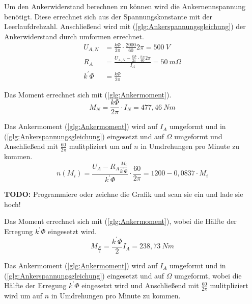 \begin{solution}
\begin{compactenum}
\item Um den Ankerwiderstand berechnen zu können wird die Ankernennspannung benötigt. Diese errechnet sich aus der Spannungskonstante mit der Leerlaufdrehzahl. Anschließend wird mit (\ref{glg:Ankerspannungsgleichung}) der Ankerwiderstand durch umformen errechnet.\\
\begin{align}
U_{A,N} &= \frac{k \Phi}{2 \pi} \cdot \frac{2000}{60} 2 \pi = 500~V\\
R_A &= \frac{U_{A,N} - \frac{k \Phi}{2 \pi} \cdot \frac{n_N}{60} 2 \pi}{I_A}=50~m \Omega\\
k^{'}\Phi&= \frac{k \Phi}{2 \pi}
\end{align}
\item Das Moment errechnet sich mit (\ref{glg:Ankermoment}).\\
\begin{equation}
M_N=\frac{k \Phi}{2 \pi} \cdot I_N =477,46~Nm
\end{equation}
\item Das Ankermoment (\ref{glg:Ankermoment}) wird auf $I_A$ umgeformt und in (\ref{glg:Ankerspannungsgleichung}) eingesetzt und auf $\Omega$ umgeformt und Anschließend mit $\frac{60}{2 \pi}$ mulitpliziert um auf $n$ in Umdrehungen pro Minute zu kommen.
\begin{equation}
n(M_i) = \frac{U_A - R_A \frac{M_i}{k^{'} \Phi}}{k^{'}\Phi} \cdot \frac{60}{2 \pi}=1200-0,0837 \cdot M_i
\end{equation}
\item \textbf{TODO:} Programmiere oder zeichne die Grafik und scan sie ein und lade sie hoch!
\item Das Moment errechnet sich mit (\ref{glg:Ankermoment}), wobei die Hälfte der Erregung $k^{'} \Phi$ eingesetzt wird.
\begin{equation}
M_{\frac{N}{2}} = \frac{k^{'}\Phi}{2} I_A =238,73~Nm
\end{equation}
\item Das Ankermoment (\ref{glg:Ankermoment}) wird auf $I_A$ umgeformt und in (\ref{glg:Ankerspannungsgleichung}) eingesetzt und auf $\Omega$ umgeformt, wobei die Hälfte der Erregung $k^{'} \Phi$ eingesetzt wird und Anschließend mit $\frac{60}{2 \pi}$ mulitpliziert wird um auf $n$ in Umdrehungen pro Minute zu kommen.

\end{compactenum}
\end{solution}
